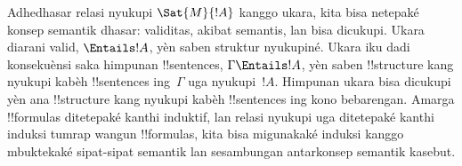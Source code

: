\documentclass[../../../include/open-logic-section]{subfiles}
\begin{document}
Adhedhasar relasi nyukupi $\Sat{M}{!A}$ kanggo ukara,
kita bisa netepaké konsep semantik dhasar: validitas,
akibat semantis, lan bisa dicukupi. Ukara diarani valid,
$\Entails !A$, yèn saben struktur nyukupiné. Ukara iku
dadi konsekuènsi saka himpunan !!{sentence}s,
$\Gamma \Entails !A$, yèn saben !!{structure} kang
nyukupi kabèh !!{sentence}s ing~$\Gamma$ uga nyukupi~$!A$.
Himpunan ukara bisa dicukupi yèn ana !!{structure} kang
nyukupi kabèh !!{sentence}s ing kono bebarengan. Amarga
!!{formula}s ditetepaké kanthi induktif, lan relasi nyukupi
uga ditetepaké kanthi induksi tumrap wangun !!{formula}s,
kita bisa migunakaké induksi kanggo mbuktekaké sipat-sipat
semantik lan sesambungan antarkonsep semantik kasebut.
\end{document}
